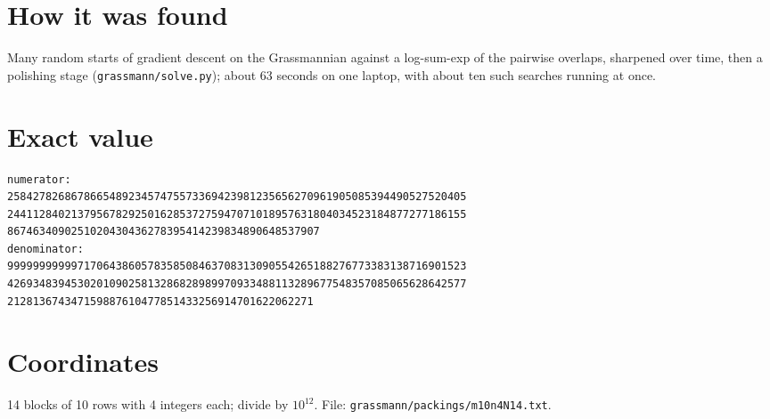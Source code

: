 \documentclass[11pt,a4paper]{article}
\begin{document}
\section{How it was found}
Many random starts of gradient descent on the Grassmannian against a log-sum-exp of the pairwise overlaps, sharpened over time, then a polishing stage (\texttt{grassmann/solve.py}); about 63 seconds on one laptop, with about ten such searches running at once.


\appendix
\section{Exact value}
{\small
\begin{verbatim}
numerator:
258427826867866548923457475573369423981235656270961905085394490527520405
244112840213795678292501628537275947071018957631804034523184877277186155
8674634090251020430436278395414239834890648537907
denominator:
999999999997170643860578358508463708313090554265188276773383138716901523
426934839453020109025813286828989970933488113289677548357085065628642577
212813674347159887610477851433256914701622062271
\end{verbatim}}

\section{Coordinates}
14 blocks of 10 rows with 4 integers each; divide by $10^{12}$. File: \texttt{grassmann/packings/m10n4N14.txt}.
{\tiny
\begin{multicols}{3}
\end{multicols}}
\end{document}
